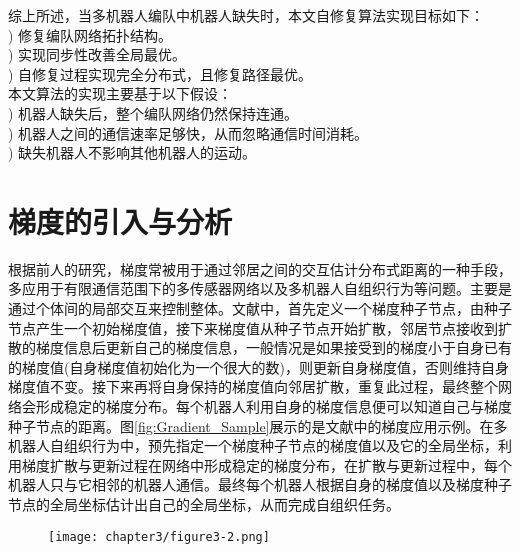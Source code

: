 综上所述，当多机器人编队中机器人缺失时，本文自修复算法实现目标如下：\\
\indent{}) 修复编队网络拓扑结构。\\
\indent{}) 实现同步性改善全局最优。\\
\indent{}) 自修复过程实现完全分布式，且修复路径最优。\\

本文算法的实现主要基于以下假设：\\
\indent{}) 机器人缺失后，整个编队网络仍然保持连通。\\
\indent{}) 机器人之间的通信速率足够快，从而忽略通信时间消耗。\\
\indent{}) 缺失机器人不影响其他机器人的运动。

\section{梯度的引入与分析}
根据前人的研究，梯度常被用于通过邻居之间的交互估计分布式距离的一种手段\supercite{SciencePaper,nagpal2003organizing,stoy2006using,rubenstein2012kilobot,meng2011autonomous,terada2008automatic}，多应用于有限通信范围下的多传感器网络\supercite{nagpal2003organizing}以及多机器人自组织行为\supercite{SciencePaper,stoy2006using}等问题。主要是通过个体间的局部交互来控制整体。文献\parencite{SciencePaper,stoy2006using,rubenstein2012kilobot,terada2008automatic}中，首先定义一个梯度种子节点，由种子节点产生一个初始梯度值，接下来梯度值从种子节点开始扩散，邻居节点接收到扩散的梯度信息后更新自己的梯度信息，一般情况是如果接受到的梯度小于自身已有的梯度值(自身梯度值初始化为一个很大的数)，则更新自身梯度值，否则维持自身梯度值不变。接下来再将自身保持的梯度值向邻居扩散，重复此过程，最终整个网络会形成稳定的梯度分布。每个机器人利用自身的梯度信息便可以知道自己与梯度种子节点的距离。图\ref{fig:Gradient_Sample}展示的是文献\parencite{SciencePaper}中的梯度应用示例。在多机器人自组织行为中，预先指定一个梯度种子节点的梯度值以及它的全局坐标，利用梯度扩散与更新过程在网络中形成稳定的梯度分布，在扩散与更新过程中，每个机器人只与它相邻的机器人通信。最终每个机器人根据自身的梯度值以及梯度种子节点的全局坐标估计出自己的全局坐标，从而完成自组织任务。
\begin{figure}[!htbp]
	\centering
	\texttt{[image: chapter3/figure3-2.png]}
\end{figure}

